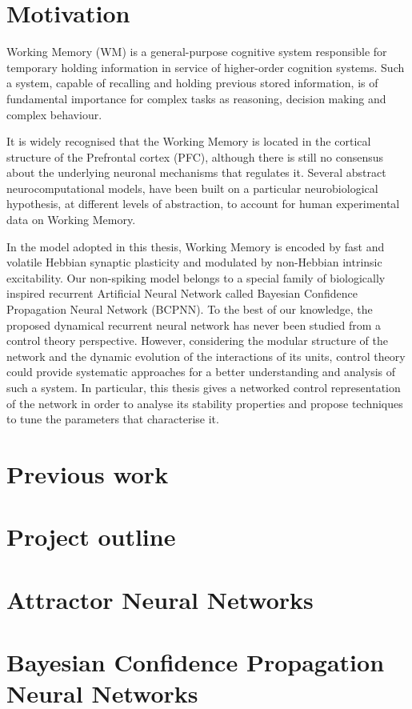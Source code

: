 \section{Motivation}
Working Memory (WM) is a general-purpose cognitive system responsible for temporary holding information in service of higher-order cognition
systems. Such a system, capable of recalling and holding previous stored information, is of fundamental importance for complex tasks as reasoning,
decision making and complex behaviour.

It is widely recognised that the Working Memory is located in the cortical structure of the Prefrontal cortex (PFC), although there is still no consensus
about the underlying neuronal mechanisms that regulates it.
Several abstract neurocomputational models, have been built on a particular neurobiological hypothesis, at different levels of abstraction, to account
for human experimental data on Working Memory.

In the model adopted in this thesis, Working Memory is encoded by fast and volatile Hebbian synaptic plasticity and modulated by non-Hebbian intrinsic excitability. Our non-spiking model belongs to a special family of biologically inspired recurrent Artificial Neural Network called Bayesian Confidence Propagation Neural Network (BCPNN).
To the best of our knowledge, the proposed dynamical recurrent neural network has never been studied from a control theory perspective. However,
considering the modular structure of the network and the dynamic evolution of the interactions of its units, control theory could provide systematic
approaches for a better understanding and analysis of such a system. In particular, this thesis gives a networked control representation of the network in order to analyse its stability properties and propose techniques to tune the parameters that characterise it.

\section{Previous work}


\section{Project outline}
\section{Attractor Neural Networks}

\section{Bayesian Confidence Propagation Neural Networks}

